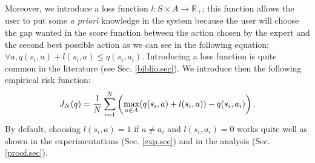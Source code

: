 \documentclass{article}
\begin{document}
Moreover, we introduce a loss function $l: S \times A \rightarrow \mathbb{R}_+$; this function allows the user to put some \emph{a priori} knowledge in the system because the user will choose the gap wanted in the score function between the action chosen by the expert and the second best possible action as we can see in the following equation:
$\forall a, q(s_i,a) + l(s_i,a) \leq q(s_i,a_i)$. Introducing a loss function is quite common in the literature (see Sec. \ref{biblio.sec}). We introduce then the following empirical risk function:
\begin{equation}
\label{Jdef.eqn}
J_N(q) = {1\over N} \sum_{i=1}^N\left(\max_{a\in A}(q(s_i,a) + l(s_i,a)) - q(s_i,a_i) \right).
\end{equation}
%
%
By default, choosing $l(s_i,a) = 1$ if $a\neq a_i$ and $l(s_i,a_i)=0$ works quite well as shown in the experimentations (Sec. \ref{exp.sec}) and in the analysis (Sec. \ref{proof.sec}).\\
\end{document}
